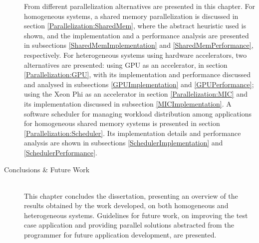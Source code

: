 \begin{description}
	From different parallelization alternatives are presented in this chapter. For homogeneous systems, a shared memory parallelization is discussed in section \ref{Parallelization:SharedMem}, where the abstract heuristic used is shown, and the implementation and a performance analysis are presented in subsections \ref{SharedMemImplementation} and \ref{SharedMemPerformance}, respectively. For heterogeneous systems using hardware accelerators, two alternatives are presented: using GPU as an accelerator, in section \ref{Parallelization:GPU}, with its implementation and performance discussed and analysed in subsections \ref{GPUImplementation} and \ref{GPUPerformance}; using the \intel Xeon Phi as an accelerator in section \ref{Parallelization:MIC} and its implementation discussed in subsection \ref{MICImplementation}. A software scheduler for managing workload distribution among applications for homogeneous shared memory systems is presented in section \ref{Parallelization:Scheduler}. Its implementation details and performance analysis are shown in subsections \ref{SchedulerImplementation} and \ref{SchedulerPerformance}.
	\item[Conclusions \& Future Work] \hfill \\
	This chapter concludes the dissertation, presenting an overview of the results obtained by the work developed, on both homogeneous and heterogeneous systems. Guidelines for future work, on improving the test case application and providing parallel solutions abstracted from the programmer for future application development, are presented.
\end{description}
